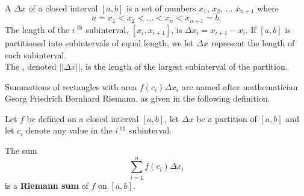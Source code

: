 {A  $\Delta x$ of a closed interval $[a,b]$ is a set of numbers $x_1$, $x_2$, $\ldots$ $x_{n+1}$ where 
$$a=x_1 < x_2 < \ldots < x_n < x_{n+1}=b.$$
The length of the $i^\text{ th}$ subinterval, $[x_i,x_{i+1}]$, is $\Delta x_i = x_{i+1}-x_i$. If $[a,b]$ is partitioned into subintervals of equal length, we let $\Delta x$ represent the length of each subinterval.\\

The , denoted $||\Delta x||$, is the length of the largest subinterval of the partition.

%
}

Summations of rectangles with area $f(c_i)\Delta x_i$ are named after mathematician Georg Friedrich Bernhard Riemann, as given in the following definition.



{%
%
%
Let $f$ be defined on a closed interval $[a,b]$, let $\Delta x$ be a partition of $[a,b]$ 
and let $c_i$ denote any value in the $i^\text{ th}$ subinterval.

The sum $$\sum_{i=1}^n f(c_i)\Delta x_i$$  is a \textbf{Riemann sum} of $f$ on $[a,b]$.}


